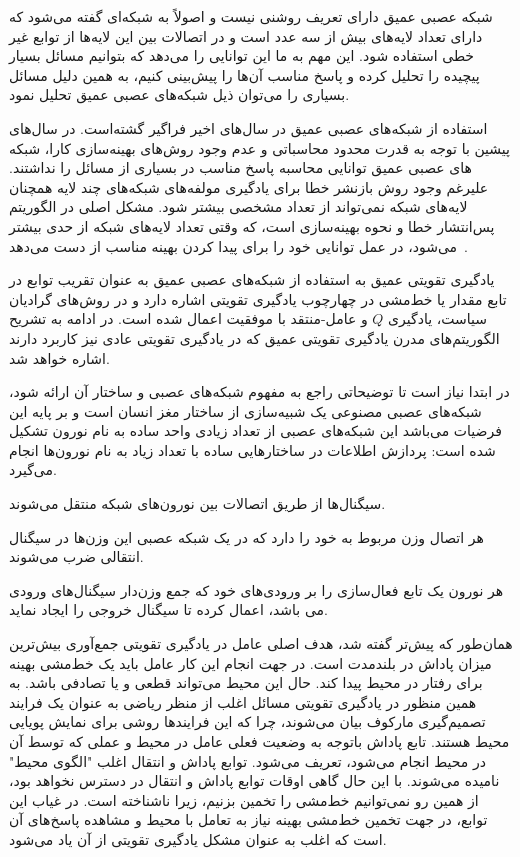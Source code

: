 شبکه عصبی عمیق دارای تعریف روشنی نیست و اصولاً به شبکه‌ای گفته می‌شود که دارای تعداد لایه‌های بیش از سه عدد است و در اتصالات بین این لایه‌ها از توابع غیر خطی استفاده شود. این مهم به ما این توانایی را می‌دهد که بتوانیم مسائل بسیار پیچیده را تحلیل کرده و پاسخ مناسب آن‌ها را پیش‌بینی کنیم، به همین دلیل مسائل بسیاری را می‌توان ذیل شبکه‌های عصبی عمیق تحلیل نمود.


استفاده از شبکه‌های عصبی عمیق در سال‌های اخیر فراگیر گشته‌است. در سال‌های پیشین با توجه به قدرت محدود محاسباتی و عدم وجود روش‌های بهینه‌سازی کارا، شبکه های عصبی عمیق توانایی محاسبه پاسخ مناسب در بسیاری از مسائل را نداشتند. علیرغم وجود روش بازنشر خطا برای یادگیری مولفه‌های شبکه‌های چند لایه همچنان لایه‌های شبکه نمی‌تواند از تعداد مشخصی بیشتر شود. مشکل اصلی در الگوریتم پس‌انتشار خطا و نحوه بهینه‌سازی است، که وقتی تعداد لایه‌های شبکه از حدی بیشتر می‌شود، در عمل توانایی خود را برای پیدا کردن بهینه مناسب از دست می‌دهد~\cite{schmidhuber2015deep}.

یادگیری تقویتی عمیق به استفاده از شبکه‌های عصبی عمیق به عنوان تقریب توابع در تابع مقدار یا خط‌مشی در چهارچوب یادگیری تقویتی اشاره دارد و در روش‌های گرادیان سیاست، یادگیری $Q$ و عامل-منتقد با موفقیت اعمال شده است. در ادامه به تشریح الگوریتم‌های مدرن یادگیری تقویتی عمیق که در یادگیری تقویتی عادی نیز کاربرد دارند اشاره خواهد شد.

در ابتدا نیاز است تا توضیحاتی راجع به مفهوم شبکه‌های عصبی و ساختار آن ارائه شود، شبکه‌های عصبی مصنوعی یک شبیه‌سازی از ساختار مغز انسان است و بر پایه این فرضیات می‌باشد این شبکه‌های عصبی از تعداد زیادی واحد ساده به نام نورون تشکیل شده است:
 پردازش اطلاعات در ساختارهایی ساده با تعداد زیاد به نام نورون‌ها انجام می‌گیرد.

 سیگنال‌ها از طریق اتصالات بین نورون‌های شبکه منتقل می‌شوند.

 هر اتصال وزن مربوط به خود را دارد که در یک شبکه عصبی این وزن‌ها در سیگنال انتقالی ضرب
می‌شوند.

 هر نورون یک تابع فعال‌سازی را بر ورودی‌های خود که جمع وزن‌دار سیگنال‌های ورودی می باشد، 
اعمال کرده تا سیگنال خروجی را ایجاد نماید.




همان‌طور که پیش‌تر گفته شد، هدف اصلی عامل در یادگیری تقویتی جمع‌آوری بیش‌ترین میزان پاداش در بلندمدت است. در جهت انجام این کار عامل باید یک خط‌مشی بهینه برای رفتار در محیط پیدا کند. حال این محیط می‌تواند قطعی و یا تصادفی باشد. به همین منظور در یادگیری تقویتی مسائل اغلب از منظر ریاضی به عنوان یک فرایند تصمیم‌گیری مارکوف بیان می‌شوند، چرا که این فرایندها روشی برای نمایش پویایی محیط هستند. تابع پاداش باتوجه‌ به وضعیت فعلی عامل در محیط و عملی که توسط آن در محیط انجام می‌شود، تعریف می‌شود. توابع پاداش و انتقال اغلب "الگوی محیط" نامیده می‌شوند. با این حال گاهی اوقات توابع پاداش و انتقال در دسترس نخواهد بود، از همین رو نمی‌توانیم خط‌مشی را تخمین بزنیم، زیرا ناشناخته است. در غیاب این توابع، در جهت تخمین خط‌مشی بهینه نیاز به تعامل با محیط و مشاهده پاسخ‌های آن است که اغلب به‌ عنوان مشکل
یادگیری تقویتی از آن یاد می‌شود.

